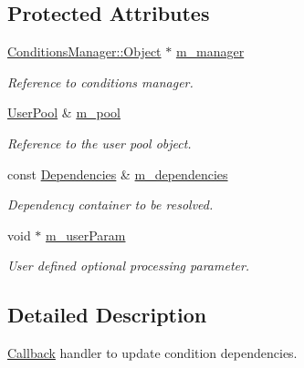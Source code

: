 \subsection*{Protected Attributes}
\begin{DoxyCompactItemize}
\item 
\hyperlink{class_d_d4hep_1_1_conditions_1_1_conditions_manager_ae865f49d144d8ba5be9eec3e1d8fec94}{Conditions\+Manager\+::\+Object} $\ast$ \hyperlink{class_d_d4hep_1_1_conditions_1_1_conditions_dependency_handler_a9c245445c4fd8c00c7e80ff67eb1ab3a}{m\+\_\+manager}
\begin{DoxyCompactList}\small\item\em Reference to conditions manager. \end{DoxyCompactList}\item 
\hyperlink{class_d_d4hep_1_1_conditions_1_1_user_pool}{User\+Pool} \& \hyperlink{class_d_d4hep_1_1_conditions_1_1_conditions_dependency_handler_a71ec45fb6d8dabbf7e055687ab8bea5a}{m\+\_\+pool}
\begin{DoxyCompactList}\small\item\em Reference to the user pool object. \end{DoxyCompactList}\item 
const \hyperlink{class_d_d4hep_1_1_conditions_1_1_conditions_dependency_handler_a4a063b30ffccb0e30f3302f1537aef10}{Dependencies} \& \hyperlink{class_d_d4hep_1_1_conditions_1_1_conditions_dependency_handler_a8ee531f77ba4feb9f1c767f59d0f607a}{m\+\_\+dependencies}
\begin{DoxyCompactList}\small\item\em Dependency container to be resolved. \end{DoxyCompactList}\item 
void $\ast$ \hyperlink{class_d_d4hep_1_1_conditions_1_1_conditions_dependency_handler_a0566a51b0e547abb517f162cf90a6db0}{m\+\_\+user\+Param}
\begin{DoxyCompactList}\small\item\em User defined optional processing parameter. \end{DoxyCompactList}\end{DoxyCompactItemize}


\subsection{Detailed Description}
\hyperlink{class_d_d4hep_1_1_callback}{Callback} handler to update condition dependencies. 

